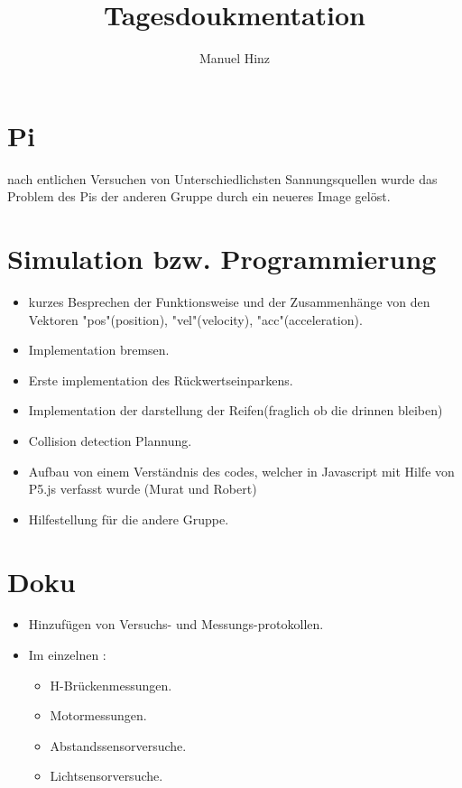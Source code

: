 \documentclass{article}
\author{Manuel Hinz}
\title{Tagesdoukmentation}
\begin{document}
\maketitle

\section{Pi}

nach entlichen Versuchen von Unterschiedlichsten Sannungsquellen wurde das Problem des Pis der anderen Gruppe durch ein neueres Image gelöst.

\section{Simulation bzw. Programmierung}

\begin{itemize}

\item kurzes Besprechen der Funktionsweise und der Zusammenhänge von den Vektoren "pos"(position), "vel"(velocity), "acc"(acceleration).

\item Implementation bremsen.

\item Erste implementation des Rückwertseinparkens.

\item Implementation der darstellung der Reifen(fraglich ob die drinnen bleiben)

\item Collision detection Plannung.

\item Aufbau von einem Verständnis des codes, welcher in  Javascript mit Hilfe von P5.js verfasst wurde (Murat und Robert)

\item Hilfestellung für die andere Gruppe.

\end{itemize}

\section{Doku}

\begin{itemize}

\item Hinzufügen von Versuchs- und Messungs-protokollen.

\item Im einzelnen : 
\begin{itemize}

\item H-Brückenmessungen.

\item Motormessungen.

\item Abstandssensorversuche.

\item Lichtsensorversuche.

\end{itemize}

\end{itemize}
\end{document}
